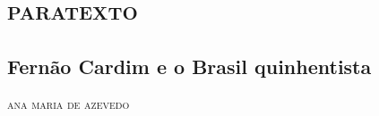 \part{\textsc{paratexto}} 

\chapter[Fernão Cardim e o Brasil quinhentista, \emph{por Ana Maria de Azevedo}]{Fernão Cardim e o Brasil quinhentista}

\begin{flushright}
\textsc{ana maria de azevedo}
\end{flushright}

%
%
